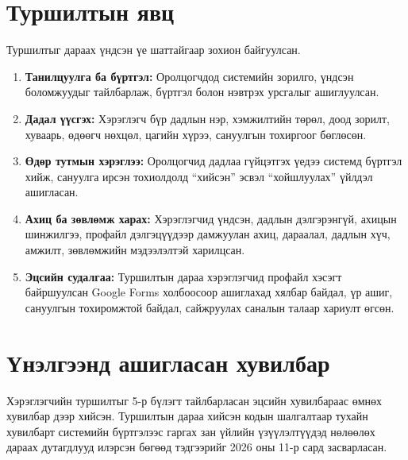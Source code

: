 \section{Туршилтын явц}

Туршилтыг дараах үндсэн үе шаттайгаар зохион байгуулсан.

\begin{enumerate}
    \item \textbf{Танилцуулга ба бүртгэл:} Оролцогчдод системийн зорилго, үндсэн боломжуудыг тайлбарлаж, бүртгэл болон нэвтрэх урсгалыг ашиглуулсан.
    \item \textbf{Дадал үүсгэх:} Хэрэглэгч бүр дадлын нэр, хэмжилтийн төрөл, доод зорилт, хуваарь, өдөөгч нөхцөл, цагийн хүрээ, сануулгын тохиргоог бөглөсөн.
    \item \textbf{Өдөр тутмын хэрэглээ:} Оролцогчид дадлаа гүйцэтгэх үедээ системд бүртгэл хийж, сануулга ирсэн тохиолдолд ``хийсэн'' эсвэл ``хойшлуулах'' үйлдэл ашигласан.
    \item \textbf{Ахиц ба зөвлөмж харах:} Хэрэглэгчид үндсэн, дадлын дэлгэрэнгүй, ахицын шинжилгээ, профайл дэлгэцүүдээр дамжуулан ахиц, дараалал, дадлын хүч, амжилт, зөвлөмжийн мэдээлэлтэй харилцсан.
    \item \textbf{Эцсийн судалгаа:} Туршилтын дараа хэрэглэгчид профайл хэсэгт байршуулсан Google Forms холбоосоор ашиглахад хялбар байдал, үр ашиг, сануулгын тохиромжтой байдал, сайжруулах саналын талаар хариулт өгсөн.
\end{enumerate}

\section{Үнэлгээнд ашигласан хувилбар}

Хэрэглэгчийн туршилтыг 5-р бүлэгт тайлбарласан эцсийн хувилбараас өмнөх хувилбар дээр хийсэн. Туршилтын дараа хийсэн кодын шалгалтаар тухайн хувилбарт системийн бүртгэлээс гаргах зан үйлийн үзүүлэлтүүдэд нөлөөлөх дараах дутагдлууд илэрсэн бөгөөд тэдгээрийг 2026 оны 11-р сард засварласан.

